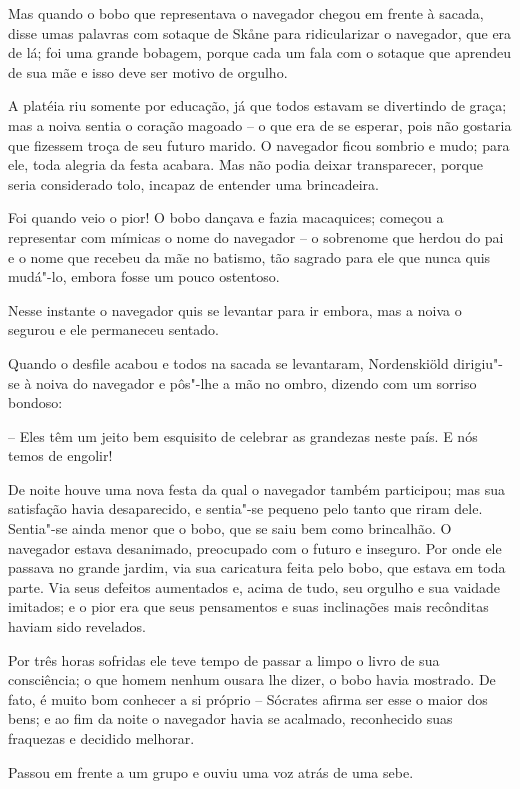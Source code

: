 Mas quando o bobo que representava o navegador chegou em frente à
sacada, disse umas palavras com sotaque de Sk\r ane para ridicularizar o
navegador, que era de lá; foi uma grande bobagem, porque cada um fala
com o sotaque que aprendeu de sua mãe e isso deve ser motivo de
orgulho. 

A platéia riu somente por educação, já que todos estavam se divertindo
de graça; mas a noiva sentia o coração magoado -- o que era de se
esperar, pois não gostaria que fizessem troça de seu futuro marido. O
navegador ficou sombrio e mudo; para ele, toda alegria da festa
acabara. Mas não podia deixar transparecer, porque seria considerado
tolo, incapaz de entender uma brincadeira.

Foi quando veio o pior! O bobo dançava e fazia macaquices; começou a
representar com mímicas o nome do navegador -- o sobrenome que herdou do
pai e o nome que recebeu da mãe no batismo, tão sagrado para ele que
nunca quis mudá"-lo, embora fosse um pouco ostentoso.

Nesse instante o navegador quis se levantar para ir embora, mas a noiva
o segurou e ele permaneceu sentado.

Quando o desfile acabou e todos na sacada se levantaram, Nordenskiöld
dirigiu"-se  à noiva do navegador e pôs"-lhe a mão no ombro, dizendo
com um sorriso bondoso:

-- Eles têm um jeito bem esquisito de celebrar as grandezas neste país. E
nós temos de engolir!

De noite houve uma nova festa da qual o navegador também participou; mas
sua satisfação havia desaparecido, e sentia"-se pequeno pelo tanto que
riram dele. Sentia"-se ainda menor que o bobo, que se saiu bem como
brincalhão. O navegador estava desanimado, preocupado com o futuro e
inseguro. Por onde ele passava no grande jardim, via sua caricatura
feita pelo bobo, que estava em toda parte. Via seus defeitos aumentados
e, acima de tudo, seu orgulho e sua vaidade imitados; e o pior era que
seus pensamentos e suas inclinações mais recônditas haviam sido 
revelados.

Por três horas sofridas ele teve tempo de passar a limpo o livro de sua
consciência; o que homem nenhum ousara lhe dizer, o bobo havia
mostrado. De fato, é muito bom conhecer a si próprio -- Sócrates afirma
ser esse o maior dos bens; e ao fim da noite o navegador havia se
acalmado, reconhecido suas fraquezas e decidido melhorar.

Passou em frente a um grupo e ouviu uma voz atrás de uma sebe.

